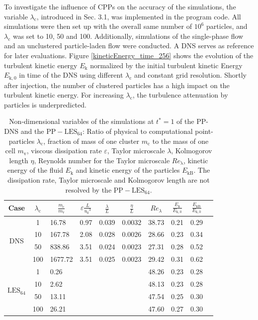 \documentclass[11pt,a4paper,openany,oneside,parskip=half*]{article}
\begin{document}
To investigate the influence of CPPs on the accuracy of the simulations, the variable $\lambda_\mathrm{c}$, introduced in Sec. 3.1, was implemented in the program code. All simulations were then set up with the overall same number of $10^6$ particles, and $\lambda_\mathrm{c}$ was set to 10, 50 and 100. Additionally, simulations of the single-phase flow and an unclustered particle-laden flow were conducted. A DNS serves as reference for later evaluations. 
\newline %
Figure \ref{kineticEnergy_time_256} shows the evolution of the turbulent kinetic energy $E_\mathrm{k}$ normalized by the initial turbulent kinetic Energy $E_\mathrm{k,0}$ in time of the DNS using different $\lambda_\mathrm{c}$ and constant grid resolution. Shortly after injection, the number of clustered particles has a high impact on the turbulent kinetic energy. For increasing $\lambda_\mathrm{c}$, the turbulence attenuation by particles is underpredicted.
\begin{table}[tbp]
	\centering
	\begin{tabular}{| c | c l | c c c c c c c |}
	\hline
	Case & $\lambda_\mathrm{c}$& \multicolumn{1}{c|}{$\frac{m_\mathrm{c}}{m_\mathrm{v}}$} &$\varepsilon \frac{L}{{u_0}^3}$ & $\frac{\lambda}{L}$ & $\frac{\eta}{L} $ & $Re_\lambda$ & $\frac{E_\mathrm{k}}{E_\mathrm{k,0}}$ & $\frac{E_\mathrm{kB}}{E_\mathrm{k,0}}$ & \\[2pt]
	\hline
	\hline
	\multirow{4}{*}{DNS}
	&1 &16.78 & 0.97& 0.039 & 0.0032 & 38.73 & 0.21 & 0.29 &\\
	&10 &167.78 & 2.08 & 0.028 & 0.0026 & 28.66 & 0.23 & 0.34 &\\
	&50 &838.86 & 3.51 & 0.024 & 0.0023 & 27.31 & 0.28 & 0.52 &\\
	&100 &1677.72 & 3.51 & 0.025 & 0.0023 & 29.42 & 0.31 & 0.62 &\\
	\hline
	\hline
	\multirow{4}{*}{$\mathrm{LES_{64}}$}
	&1 & 0.26 & &  &  & 48.26 & 0.23 & 0.28 &\\
	&10 & 2.62 & &  &  & 48.13 & 0.23 & 0.28 &\\
	&50 & 13.11 & &  &  & 47.54 & 0.25 & 0.30 &\\
	&100 & 26.21 & &  &  & 47.60 & 0.27 & 0.30 &\\
	\hline
	\end{tabular}
	\captionsetup{width=1\linewidth}
	\captionsetup{font=footnotesize}
	\caption{Non-dimensional variables of the simulations at $t^*=1$ of the PP-DNS and the $\mathrm{PP-LES_{64}}$: Ratio of physical to computational point-particles $\lambda_\mathrm{c}$, fraction of mass of one cluster $m_\mathrm{c}$ to the mass of one cell $m_\mathrm{v}$, viscous dissipation rate $\varepsilon$, Taylor microscale $\lambda$, Kolmogorov length $\eta$, Reynolds number for the Taylor microscale $Re_\mathrm{\lambda}$, kinetic energy of the fluid $E_\mathrm{k}$ and kinetic energy of the particles $E_\mathrm{kB}$. The dissipation rate, Taylor microscale and Kolmogorov length are not resolved by the $\mathrm{PP-LES_{64}}$.}
	\label{table_values_DNS_LES}
	\end{table}%
\end{document}
